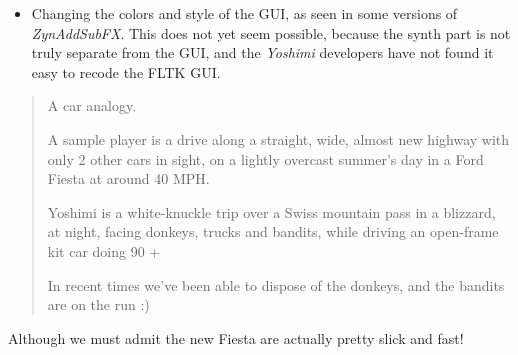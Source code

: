 \documentclass[
 11pt,
 twoside,
 a4paper,
 final                                 %
]{article}
\begin{document}
   \begin{itemize}
      \item Changing the colors and style of the GUI, as seen in some
         versions of \textsl{ZynAddSubFX}.  This does not yet seem possible,
         because the synth part is not truly separate from the GUI, and the
         \textsl{Yoshimi} developers have not found it easy to recode the
         FLTK GUI.
   \end{itemize}

   \begin{quotation}
      A car analogy.

      A sample player is a drive along a straight, wide, almost new highway
      with only 2 other cars in sight, on a lightly overcast summer's day in a
      Ford Fiesta at around 40 MPH.

      Yoshimi is a white-knuckle trip over a Swiss mountain pass in a blizzard,
      at night, facing donkeys, trucks and bandits, while driving an open-frame
      kit car doing 90 +

      In recent times we've been able to dispose of the donkeys, and the
      bandits are on the run :)
   \end{quotation}

   Although we must admit the new Fiesta are actually pretty slick and fast!




\printindex
\end{document}
